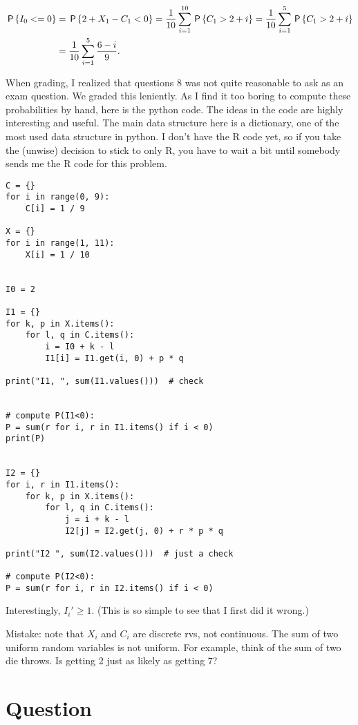 \begin{exercise}
\begin{solution}
\begin{align}
\P{I_{0} < = 0} &= \P{2 + X_{1} - C_{1} < 0} = \frac{1}{10} \sum_{i=1}^{10} \P{C_{1} > 2 + i } = \frac{1}{10} \sum_{i=1}^{5} \P{C_{1} > 2 + i } \\
&= \frac{1}{10} \sum_{i=1}^{5} \frac{6-i}{9}.
\end{align}

When grading, I realized that questions 8 was not quite reasonable to ask as an exam question.
We graded this leniently.
As I find it too boring to compute these probabilities by hand, here is the python code.
The ideas in the code are highly interesting and useful.
The main data structure here is a dictionary, one of the most used data structure in python.
I don't have the R code yet, so if you take the (unwise) decision to stick to only R, you have to wait a bit until somebody sends me the R code for this problem.
\begin{verbatim}
C = {}
for i in range(0, 9):
    C[i] = 1 / 9

X = {}
for i in range(1, 11):
    X[i] = 1 / 10


I0 = 2

I1 = {}
for k, p in X.items():
    for l, q in C.items():
        i = I0 + k - l
        I1[i] = I1.get(i, 0) + p * q

print("I1, ", sum(I1.values()))  # check


# compute P(I1<0):
P = sum(r for i, r in I1.items() if i < 0)
print(P)


I2 = {}
for i, r in I1.items():
    for k, p in X.items():
        for l, q in C.items():
            j = i + k - l
            I2[j] = I2.get(j, 0) + r * p * q

print("I2 ", sum(I2.values()))  # just a check

# compute P(I2<0):
P = sum(r for i, r in I2.items() if i < 0)
\end{verbatim}

Interestingly, $I_{i}'\geq 1$. (This is so simple to see that I first did it wrong.)



Mistake: note that $X_{i}$   and $C_{i}$ are discrete rvs, not continuous.
The sum of two uniform random variables is not uniform. For example, think of the sum of two die throws. Is getting 2 just as likely as getting 7?
\end{solution}
\end{exercise}


\section{Question}


